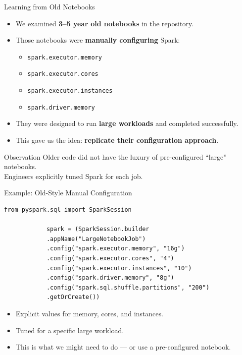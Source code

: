 \documentclass[aspectratio=169]{beamer}
\begin{document}
	\begin{frame}{Learning from Old Notebooks}
		\begin{itemize}
			\item We examined \textbf{3--5 year old notebooks} in the repository.
			\item Those notebooks were \textbf{manually configuring} Spark:
			\begin{itemize}
				\item \texttt{spark.executor.memory}
				\item \texttt{spark.executor.cores}
				\item \texttt{spark.executor.instances}
				\item \texttt{spark.driver.memory}
			\end{itemize}
			\item They were designed to run \textbf{large workloads} and completed successfully.
			\item This gave us the idea: \textbf{replicate their configuration approach}.
		\end{itemize}
		
		\begin{block}{Observation}
			Older code did not have the luxury of pre-configured ``large'' notebooks.\\
			Engineers explicitly tuned Spark for each job.
		\end{block}
	\end{frame}
	
	\begin{frame}[fragile]{Example: Old-Style Manual Configuration}
		\begin{lstlisting}[style=sparkstyle, caption={Manual Spark configuration in an old notebook}]
			from pyspark.sql import SparkSession
			
			spark = (SparkSession.builder
			.appName("LargeNotebookJob")
			.config("spark.executor.memory", "16g")
			.config("spark.executor.cores", "4")
			.config("spark.executor.instances", "10")
			.config("spark.driver.memory", "8g")
			.config("spark.sql.shuffle.partitions", "200")
			.getOrCreate())
		\end{lstlisting}
		
		\begin{itemize}
			\item Explicit values for memory, cores, and instances.
			\item Tuned for a specific large workload.
			\item This is what we might need to do --- or use a pre-configured notebook.
		\end{itemize}
	\end{frame}
	
\end{document}
